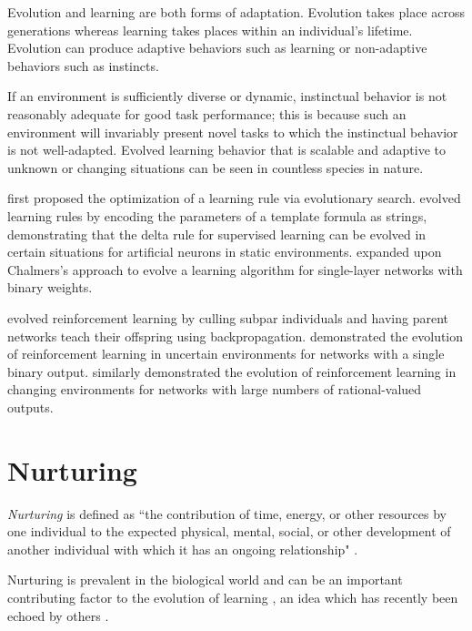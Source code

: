 \documentclass[master]{outhesis}
\begin{document}
Evolution and learning are both forms of adaptation.
Evolution takes place across generations whereas learning takes places within an individual's lifetime.
Evolution can produce adaptive behaviors such as learning or non-adaptive behaviors such as instincts.

If an environment is sufficiently diverse or dynamic, instinctual behavior is not reasonably adequate for good task performance;
this is because such an environment will invariably present novel tasks to which the instinctual behavior is not well-adapted.
Evolved learning behavior that is scalable and adaptive to unknown or changing situations can be seen in countless species in nature.

\citet{Bengio:1990aa} first proposed the optimization of a learning rule via evolutionary search.
\citet{Chalmers:1990aa} evolved learning rules by encoding the parameters of a template formula as strings, demonstrating that the delta rule for supervised learning can be evolved in certain situations for artificial neurons in static environments.
\citet{Fontanari:1991aa} expanded upon Chalmers's approach to evolve a learning algorithm for single-layer networks with binary weights.


\citet{McQuesten:1997aa} evolved reinforcement learning by culling subpar individuals and having parent networks teach their offspring using backpropagation.
\citet{Niv:2002aa} demonstrated the evolution of reinforcement learning in uncertain environments for networks with a single binary output.
\citet{Shah:2015hs} similarly demonstrated the evolution of reinforcement learning in changing environments for networks with large numbers of rational-valued outputs.

\section{Nurturing}

\emph{Nurturing} is defined as ``the contribution of time, energy, or other resources by one individual to the expected physical, mental, social, or other development of another individual with which it has an ongoing relationship" \citep{Woehrer:2012aa}.

Nurturing is prevalent in the biological world and can be an important contributing factor to the evolution of learning \citep{Woehrer:2012aa,Eskridge:2012aa},
an idea which has recently been echoed by others \citep{Soltoggio:2017bl}.
\end{document}
